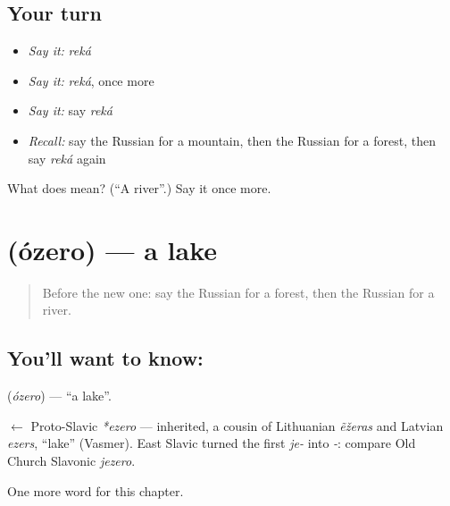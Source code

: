 \subsection*{Your turn}
\begin{itemize}
\raggedright
  \item \emph{Say it:} \emph{reká}
  \item \emph{Say it:} \emph{reká}, once more
  \item \emph{Say it:} say \emph{reká}
  \item \emph{Recall:} say the Russian for a mountain, then the Russian for a forest, then say \emph{reká} again
\end{itemize}

\begin{tcolorbox}[breakable,colback=teal!4,colframe=teal!35!black,title={Before you move on}]
What does  mean? (\textquotedblleft{}A river\textquotedblright{}.) Say it once more.
\end{tcolorbox}
\section[\texorpdfstring{\ru{озеро} (ózero)}{озеро (ózero)}]{ (ózero) — a lake}

\label{lesson:RU-C56-lake}



\begin{quote}
Before the new one: say the Russian for a forest, then the Russian for a river.
\end{quote}

\subsection*{You'll want to know: }
\textbf{} (\emph{ózero}) — \textquotedblleft{}a lake\textquotedblright{}.

\begin{cousinweb}
\textbf{} $\leftarrow$ Proto-Slavic \emph{*ezero} — inherited, a cousin of Lithuanian \emph{ẽžeras} and Latvian \emph{ezers}, \textquotedblleft{}lake\textquotedblright{} (Vasmer). East Slavic turned the first \emph{je-} into \emph{-}: compare Old Church Slavonic \emph{jezero}.
\end{cousinweb}

\begin{grammarlens}[title={What you've built}]
One more word for this chapter.
\end{grammarlens}

